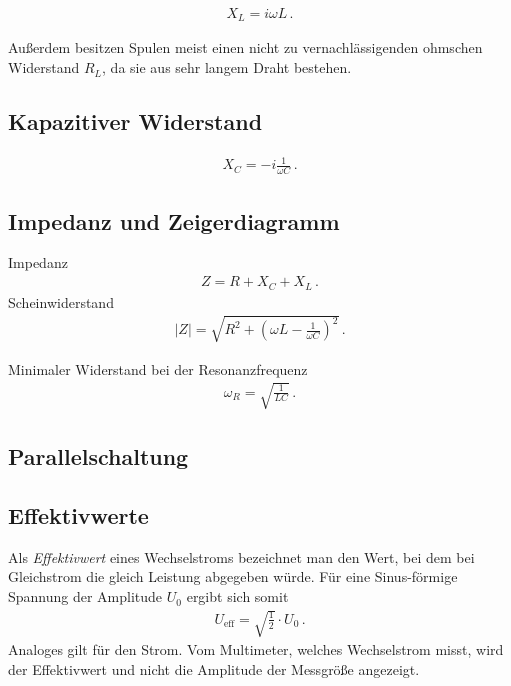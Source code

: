 \documentclass[12pt,a4paper,titlepage,headinclude,bibtotoc]{scrartcl}
\begin{document}
\begin{align}
	X_L=i\omega L \,.
\end{align}

Außerdem besitzen Spulen meist einen nicht zu vernachlässigenden ohmschen Widerstand $R_L$, da sie aus sehr langem Draht bestehen.

\subsection{Kapazitiver Widerstand}

\begin{align}
	X_C=-i\frac{1}{\omega C} \,.
\end{align}

\subsection{Impedanz und Zeigerdiagramm}
Impedanz
\begin{align}
	Z=R+X_C+X_L \,.
\end{align}
Scheinwiderstand
\begin{align}
	|Z|=\sqrt{R^2+\left(\omega L - \frac{1}{\omega C}\right)^2} \,.
\end{align}

Minimaler Widerstand bei der Resonanzfrequenz
\begin{align}
	\omega_R=\sqrt{\frac{1}{LC}} \,.
\end{align}

\subsection{Parallelschaltung}

\subsection{Effektivwerte}
Als \textit{Effektivwert} eines Wechselstroms bezeichnet man den Wert, bei dem bei Gleichstrom die gleich Leistung abgegeben würde.
Für eine Sinus-förmige Spannung der Amplitude $U_0$ ergibt sich somit
\begin{align}
	U_\text{eff}=\sqrt{\frac{1}{2}}\cdot U_0 \,.
\end{align}
Analoges gilt für den Strom.
Vom Multimeter, welches Wechselstrom misst, wird der Effektivwert und nicht die Amplitude der Messgröße angezeigt.
                                                                                                                                                                      
\end{document}
